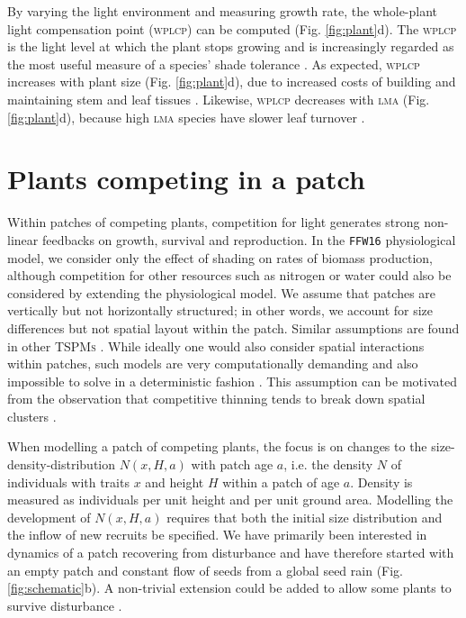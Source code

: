 \documentclass[a4paper,11pt]{article}
\begin{document}
By varying the light environment and measuring growth rate, the whole-plant light compensation point (\textsc{wplcp}) can be computed (Fig.
\ref{fig:plant}d). The \textsc{wplcp} is the light level at which the plant
stops growing and is increasingly regarded as the most useful
measure of a species' shade tolerance
\citep{Givnish-1988, Baltzer-2007, Lusk-2013}. As expected, \textsc{wplcp}
increases with plant size (Fig. \ref{fig:plant}d), due to increased costs of building and
maintaining stem and leaf tissues \citep{Givnish-1988}. Likewise, \textsc{wplcp}
decreases with \textsc{lma} (Fig. \ref{fig:plant}d), because high \textsc{lma} species have slower leaf turnover \citep{Baltzer-2007, Lusk-2013}.

\section{Plants competing in a patch}

Within patches of competing plants, competition for light generates
strong non-linear feedbacks on growth, survival and reproduction. In the
\texttt{FFW16} physiological model, we consider only the effect of
shading on rates of biomass production, although competition for other
resources such as nitrogen or water could also be considered by extending the
physiological model. We assume that patches are vertically but not horizontally
structured; in other words, we account for size differences but not spatial
layout within the patch. Similar assumptions are found in other \textsc{TSPMs}
\citep{Shugart-1980, Kohyama-1993, Huston-1987, Moorcroft-2001, Smith-2014}.
While ideally one would also consider spatial interactions within patches,
such models are very computationally demanding and also
impossible to solve in a deterministic fashion \citep{Shugart-1980,
Pacala-1996}. This assumption can be motivated from the observation
that competitive thinning tends to break down spatial clusters
\citep{Strigul-2008}.

When modelling a patch of competing plants, the focus is on changes to the size-
density-distribution \(N(x, H, a)\) with patch age \(a\), i.e. the density \(N\) of
individuals with traits \(x\) and height \(H\) within a patch of age \(a\).
Density is measured as individuals per unit height and per unit ground area.
Modelling the development of  \(N(x, H, a)\) requires that both the initial size
distribution and the inflow of new recruits be specified. We have primarily
been interested in dynamics of a patch recovering from disturbance and have
therefore started with an empty patch and constant flow of seeds from a global
seed rain (Fig. \ref{fig:schematic}b). A non-trivial extension could be added to allow some plants to survive disturbance \citep[following][]{Kohyama-1993}.
\end{document}
